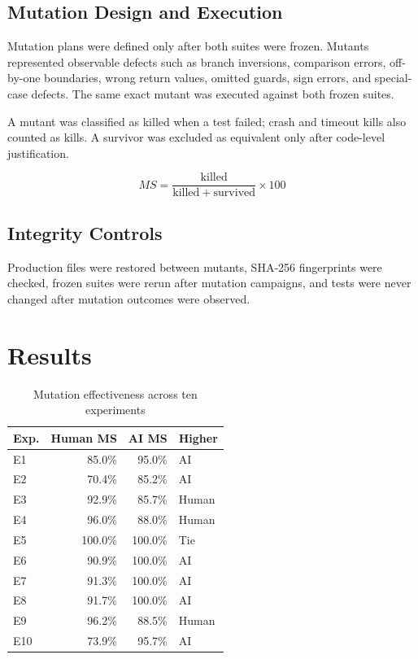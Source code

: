 \documentclass[10pt,conference]{IEEEtran}
\begin{document}
\subsection{Mutation Design and Execution}
Mutation plans were defined only after both suites were frozen. Mutants represented observable defects such as branch inversions, comparison errors, off-by-one boundaries, wrong return values, omitted guards, sign errors, and special-case defects. The same exact mutant was executed against both frozen suites.

A mutant was classified as killed when a test failed; crash and timeout kills also counted as kills. A survivor was excluded as equivalent only after code-level justification.

\begin{equation}
MS = \frac{\mathrm{killed}}{\mathrm{killed}+\mathrm{survived}}\times100
\end{equation}

\subsection{Integrity Controls}
Production files were restored between mutants, SHA-256 fingerprints were checked, frozen suites were rerun after mutation campaigns, and tests were never changed after mutation outcomes were observed.

\section{Results}

\begin{table}[ht]
\centering
\caption{Mutation effectiveness across ten experiments}
\label{tab:results}
\begin{tabular}{lrrl}
\toprule
Exp. & Human MS & AI MS & Higher \\
\midrule
E1 & 85.0\% & 95.0\% & AI \\
E2 & 70.4\% & 85.2\% & AI \\
E3 & 92.9\% & 85.7\% & Human \\
E4 & 96.0\% & 88.0\% & Human \\
E5 & 100.0\% & 100.0\% & Tie \\
E6 & 90.9\% & 100.0\% & AI \\
E7 & 91.3\% & 100.0\% & AI \\
E8 & 91.7\% & 100.0\% & AI \\
E9 & 96.2\% & 88.5\% & Human \\
E10 & 73.9\% & 95.7\% & AI \\
\bottomrule
\end{tabular}
\end{table}
\end{document}
